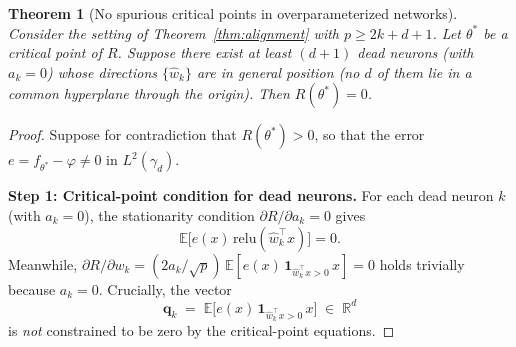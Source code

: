 \documentclass[11pt]{amsart}
\newtheorem{theorem}{Theorem}[section]
\theoremstyle{definition}
\newcommand{\R}{\mathbb{R}}
\newcommand{\E}{\mathbb{E}}
\newcommand{\relu}{\mathrm{relu}}
\begin{document}
\begin{theorem}[No spurious critical points in overparameterized networks]
\label{thm:no-spurious}
Consider the setting of Theorem~\ref{thm:alignment} with $p \geq 2k + d + 1$.
Let $\theta^*$ be a critical point of $R$.  Suppose there exist at least
$(d+1)$ dead neurons (with $a_k = 0$) whose directions
$\{\hat{w}_k\}$ are in general position (no $d$ of them lie in a common
hyperplane through the origin).  Then $R(\theta^*) = 0$.
\end{theorem}

\begin{proof}
Suppose for contradiction that $R(\theta^*) > 0$, so that the error
$e = f_{\theta^*} - \varphi \neq 0$ in $L^2(\gamma_d)$.

\medskip
\noindent\textbf{Step 1: Critical-point condition for dead neurons.}
For each dead neuron $k$ (with $a_k = 0$), the stationarity condition
$\partial R / \partial a_k = 0$ gives
\begin{equation}\label{eq:dead-grad-a}
  \E\bigl[e(x)\,\relu(\hat{w}_k^\top x)\bigr] = 0.
\end{equation}
Meanwhile, $\partial R / \partial w_k = (2a_k/\sqrt{p})\,
\E[e(x)\,\mathbf{1}_{\hat{w}_k^\top x > 0}\,x] = 0$ holds trivially
because $a_k = 0$.  Crucially, the vector
\begin{equation}\label{eq:dead-grad-w}
  \mathbf{q}_k \;=\; \E\bigl[e(x)\,\mathbf{1}_{\hat{w}_k^\top x > 0}\,x\bigr]
  \;\in\; \R^d
\end{equation}
is \emph{not} constrained to be zero by the critical-point equations.


\end{proof}
\end{document}
